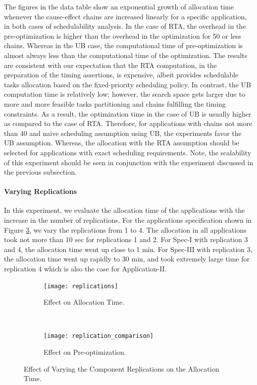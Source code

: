 The figures in the data table show an exponential growth of allocation time whenever the cause-effect chains are increased linearly for a specific application, in both cases of schedulability analysis. In the case of RTA, the overhead in the pre-optimization is higher than the overhead in the optimization for 50 or less chains. Whereas in the UB case, the computational time of pre-optimization is almost always less than the computational time of the optimization. 
The results are consistent with our expectation that the RTA computation, in the preparation of the timing assertions, is expensive, albeit provides schedulable tasks allocation based on the fixed-priority scheduling policy. In contrast, the UB computation time is relatively low; however, the search space gets larger due to more and more feasible tasks partitioning and chains fulfilling the timing constraints. As a result, the optimization time in the case of UB is usually higher as compared to the case of RTA. Therefore, for applications with chains not more than 40 and naive scheduling assumption using UB, the experiments favor the UB assumption. Whereas, the allocation with the RTA assumption should be selected for applications with exact scheduling requirements. Note, the scalability of this experiment should be seen in conjunction with the experiment discussed in the previous subsection.

\paragraph{Varying Replications}
In this experiment, we evaluate the allocation time of the applications with the increase in the number of replications. For the applications specification shown in Figure \ref{fig_replication}, we vary the replications from 1 to 4. 
The allocation in all applications took not more than 10 sec for replications 1 and 2. For Spec-I with replication 3 and 4, the allocation time went up close to 1 min. For Spec-III with replication 3, the allocation time went up rapidly to 30 min, and took extremely large time for replication 4 which is also the case for Application-II.
\begin{figure}[h]
    \centering
    \begin{subfigure}[b]{0.475\textwidth}
        \texttt{[image: replications]}
        \caption{Effect on Allocation Time.}
        \label{fig_replication_1}
    \end{subfigure}
    ~
        \begin{subfigure}[b]{0.475\textwidth}
        \texttt{[image: replication\_comparison]}
        \caption{Effect on Pre-optimization.}
        \label{fig_replication_2}
    \end{subfigure}
    \caption{Effect of Varying the Component Replications on the Allocation Time.}
    \label{fig_replication}\vspace{-0.5cm}
\end{figure}

